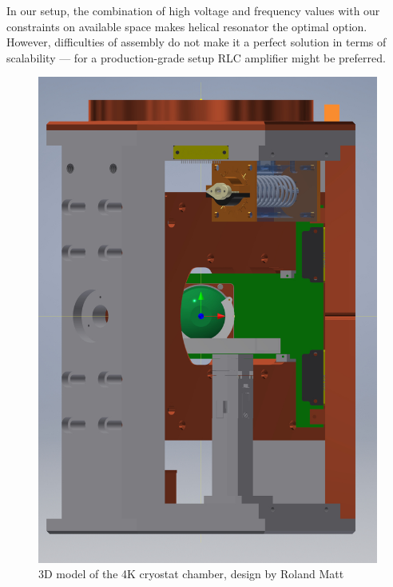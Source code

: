 In our setup, the combination of high voltage and frequency values with our constraints on available space makes helical resonator the optimal option. However, difficulties of assembly do not make it a perfect solution in terms of scalability --- for a production-grade setup RLC amplifier might be preferred.

\begin{figure}[h]
	\includegraphics[width=\textwidth]{images/4K_chamber_small}
	\caption{3D model of the 4K cryostat chamber, design by Roland Matt}
	\label{fig:4K_chamber}
\end{figure}